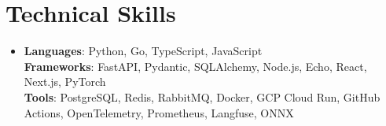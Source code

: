 \documentclass[letterpaper,11pt]{article}
\begin{document}
\section{Technical Skills}
\begin{itemize}[leftmargin=0.15in, label={}, topsep=0pt, itemsep=0pt, parsep=0pt, partopsep=0pt]
  \item{\fontsize{9.6pt}{10.0pt}\selectfont
   \textbf{Languages}{: Python, Go, TypeScript, JavaScript} \\
   \textbf{Frameworks}{: FastAPI, Pydantic, SQLAlchemy, Node.js, Echo, React, Next.js, PyTorch} \\
   \textbf{Tools}{: PostgreSQL, Redis, RabbitMQ, Docker, GCP Cloud Run, GitHub Actions, OpenTelemetry, Prometheus, Langfuse, ONNX} \\
  }
\end{itemize}
\end{document}
